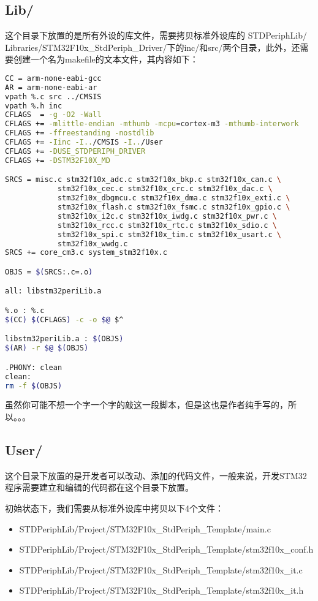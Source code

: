 \subsection{Lib/}
这个目录下放置的是所有外设的库文件，需要拷贝标准外设库的
STDPeriphLib/\\Libraries/STM32F10x\_StdPeriph\_Driver/下的inc/和src/两个目录，此外，还需要创建一个名为makefile的文本文件，其内容如下：
\begin{lstlisting}[language=bash, style=customStyleMakefile, caption=Lib/makefile]
CC = arm-none-eabi-gcc
AR = arm-none-eabi-ar 
vpath %.c src ../CMSIS
vpath %.h inc
CFLAGS  = -g -O2 -Wall
CFLAGS += -mlittle-endian -mthumb -mcpu=cortex-m3 -mthumb-interwork
CFLAGS += -ffreestanding -nostdlib
CFLAGS += -Iinc -I../CMSIS -I../User
CFLAGS += -DUSE_STDPERIPH_DRIVER
CFLAGS += -DSTM32F10X_MD

SRCS = misc.c stm32f10x_adc.c stm32f10x_bkp.c stm32f10x_can.c \
			stm32f10x_cec.c stm32f10x_crc.c stm32f10x_dac.c \
			stm32f10x_dbgmcu.c stm32f10x_dma.c stm32f10x_exti.c \
			stm32f10x_flash.c stm32f10x_fsmc.c stm32f10x_gpio.c \
			stm32f10x_i2c.c stm32f10x_iwdg.c stm32f10x_pwr.c \
			stm32f10x_rcc.c stm32f10x_rtc.c stm32f10x_sdio.c \
			stm32f10x_spi.c stm32f10x_tim.c stm32f10x_usart.c \
			stm32f10x_wwdg.c
SRCS += core_cm3.c system_stm32f10x.c

OBJS = $(SRCS:.c=.o)

all: libstm32periLib.a

%.o : %.c
$(CC) $(CFLAGS) -c -o $@ $^

libstm32periLib.a : $(OBJS)
$(AR) -r $@ $(OBJS)

.PHONY: clean 
clean: 
rm -f $(OBJS)
\end{lstlisting}
虽然你可能不想一个字一个字的敲这一段脚本，但是这也是作者纯手写的，所以。。。

\subsection{User/}
这个目录下放置的是开发者可以改动、添加的代码文件，一般来说，开发STM32程序需要建立和编辑的代码都在这个目录下放置。
\par 
初始状态下，我们需要从标准外设库中拷贝以下4个文件：
\begin{itemize}
	\item STDPeriphLib/Project/STM32F10x\_StdPeriph\_Template/main.c
	\item STDPeriphLib/Project/STM32F10x\_StdPeriph\_Template/stm32f10x\_conf.h
	\item STDPeriphLib/Project/STM32F10x\_StdPeriph\_Template/stm32f10x\_it.c
	\item STDPeriphLib/Project/STM32F10x\_StdPeriph\_Template/stm32f10x\_it.h
\end{itemize}

